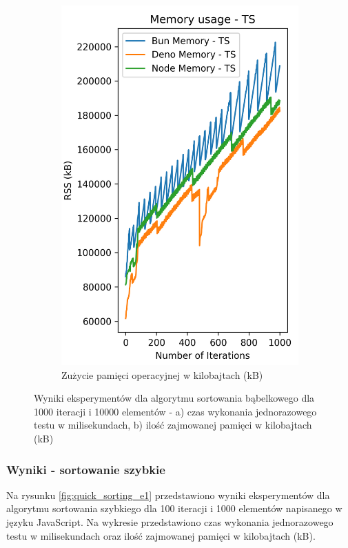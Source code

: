\begin{figure}[H]
\begin{subfigure}[b]{0.4\textwidth}
    \includegraphics[width=\textwidth]{Figures/sorting/sorting_bubble_1000_10000_ts_memory.png}
    \caption{Zużycie pamięci operacyjnej w kilobajtach (kB)}
    \label{fig:bubble_sorting_e4_ts_memory}
  \end{subfigure}
  \caption{Wyniki eksperymentów dla algorytmu sortowania bąbelkowego dla 1000 iteracji i 10000 elementów - a) czas wykonania jednorazowego testu w milisekundach, b) ilość zajmowanej pamięci w kilobajtach (kB)}
  \label{fig:bubble_sorting_e4_ts}
\end{figure}

\subsubsection{Wyniki - sortowanie szybkie}
Na rysunku \ref{fig:quick_sorting_e1} przedstawiono wyniki eksperymentów dla algorytmu sortowania szybkiego dla 100 iteracji i 1000 elementów napisanego w języku JavaScript. Na wykresie przedstawiono czas wykonania jednorazowego testu w milisekundach oraz ilość zajmowanej pamięci w kilobajtach (kB).

